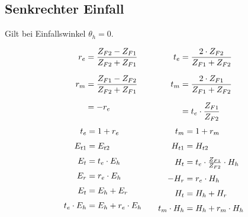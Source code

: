 
\subsection[Senkrechter Einfall]{Senkrechter Einfall}
Gilt bei Einfallswinkel $ \theta_h = 0 $.

\begin{equation*}
\setlength{\jot}{10pt}
\begin{aligned}[t]
%
	r_e &= \frac{Z_{F2}-Z_{F1}}{Z_{F2} + Z_{F1}}\\
	r_m &= \frac{Z_{F1}-Z_{F2}}{Z_{F2} + Z_{F1}}\\
	&=-r_e\\
\end{aligned}
\qquad \qquad
\begin{aligned}[t]
	t_e  &= \frac{2 \cdot Z_{F2}}{Z_{F1} + Z_{F2}}\\ 
	t_m  &= \frac{2 \cdot Z_{F1}}{Z_{F1} + Z_{F2}} \\
	&= t_e \cdot \frac{Z_{F1}}{Z_{F2}}\\
\end{aligned}
\end{equation*}
\vspace{-0.2cm}
\begin{equation*}
\setlength{\jot}{6pt}
\begin{aligned}[t]
	t_e & = 1+ r_e \\	
	E_{t1} & =E_{t2}\\
    E_t & = t_e \cdot E_h \\
	E_r & = r_e \cdot E_h \\
	E_t & = E_h + E_r \\        
	t_e\cdot E_{h} & = E_{h} + r_e\cdot  E_{h} \\
\end{aligned}
\qquad
\begin{aligned}[t]
	t_m & = 1+ r_m \\
	H_{t1} &= H_{t2}\\
	H_t & = t_e \cdot \tfrac{Z_{F1}}{Z_{F2}} \cdot H_h \\
	-H_r & = r_e \cdot H_h \\
	H_t & = H_h + H_r \\        
	t_m\cdot H_{h} & = H_{h} + r_m\cdot  H_{h} \\
\end{aligned}
\end{equation*}

